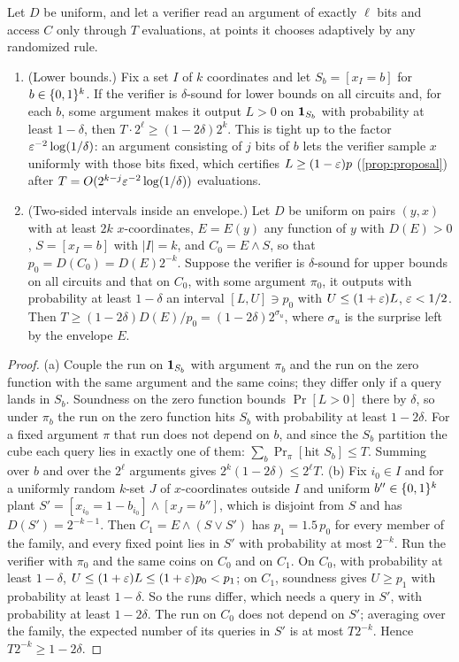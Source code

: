 \begin{theorem}\label{thm:surprise}
Let $D$ be uniform, and let a verifier read an argument of exactly $\ell$ bits
and access $C$ only through $T$ evaluations, at points it chooses adaptively by
any randomized rule.
\begin{enumerate}[label=(\alph*)]
\item (Lower bounds.) Fix a set $I$ of $k$ coordinates and let
$S_b=[x_I=b]$ for $b\in\{0,1\}^k$. If the verifier is $\delta$-sound for lower
bounds on all circuits and, for each $b$, some argument makes it output $L>0$
on $\mathbf{1}_{S_b}$ with probability at least $1-\delta$, then $T\cdot2^\ell\ge(1-2\delta)2^k$.
This is tight up to the factor $\varepsilon^{-2}\log(1/\delta)$: an argument consisting of $j$
bits of $b$ lets the verifier sample $x$ uniformly with those bits fixed, which
certifies $L\ge(1-\varepsilon)p$ (\cref{prop:proposal}) after
$T=O(2^{k-j}\varepsilon^{-2}\log(1/\delta))$ evaluations.
\item (Two-sided intervals inside an envelope.) Let $D$ be uniform on pairs
$(y,x)$ with at least $2k$ $x$-coordinates, $E=E(y)$ any function of $y$ with
$D(E)>0$, $S=[x_I=b]$ with $|I|=k$, and $C_0=E\wedge S$, so that
$p_0=D(C_0)=D(E)2^{-k}$. Suppose the verifier is $\delta$-sound for upper
bounds on all circuits and that on $C_0$, with some argument $\pi_0$, it
outputs with probability at least $1-\delta$ an interval $[L,U]\ni p_0$ with
$U\le(1+\varepsilon)L$, $\varepsilon<1/2$. Then $T\ge(1-2\delta)D(E)/p_0=(1-2\delta)2^{\sigma_u}$,
where $\sigma_u$ is the surprise left by the envelope $E$.
\end{enumerate}
\end{theorem}

\begin{proof}
(a) Couple the run on $\mathbf{1}_{S_b}$ with argument $\pi_b$ and the run on the
zero function with the same argument and the same coins; they differ only if a
query lands in $S_b$. Soundness on the zero function bounds $\Pr[L>0]$ there by
$\delta$, so under $\pi_b$ the run on the zero function hits $S_b$ with
probability at least $1-2\delta$. For a fixed argument $\pi$ that run does not
depend on $b$, and since the $S_b$ partition the cube each query lies in
exactly one of them: $\sum_b\Pr_\pi[\text{hit }S_b]\le T$. Summing over $b$
and over the $2^\ell$ arguments gives $2^k(1-2\delta)\le2^\ell T$. (b) Fix
$i_0\in I$ and for a uniformly random $k$-set $J$ of $x$-coordinates outside $I$
and uniform $b''\in\{0,1\}^k$ plant $S'=[x_{i_0}=1-b_{i_0}]\wedge[x_J=b'']$,
which is disjoint from $S$ and has $D(S')=2^{-k-1}$. Then
$C_1=E\wedge(S\vee S')$ has $p_1=1.5\,p_0$ for every member of the family, and
every fixed point lies in $S'$ with probability at most $2^{-k}$. Run the
verifier with $\pi_0$ and the same coins on $C_0$ and on $C_1$. On $C_0$, with
probability at least $1-\delta$, $U\le(1+\varepsilon)L\le(1+\varepsilon)p_0<p_1$; on $C_1$,
soundness gives $U\ge p_1$ with probability at least $1-\delta$. So the runs
differ, which needs a query in $S'$, with probability at least $1-2\delta$.
The run on $C_0$ does not depend on $S'$; averaging over the family, the
expected number of its queries in $S'$ is at most $T2^{-k}$. Hence
$T2^{-k}\ge1-2\delta$.
\end{proof}

